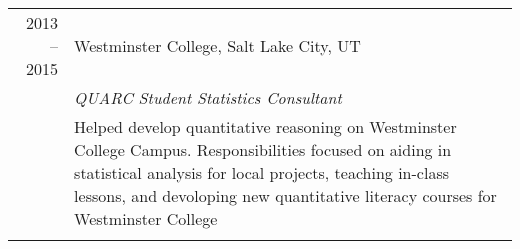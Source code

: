 \documentclass[a4paper,10pt]{report}
\begin{document}
\begin{tabular}{r|p{11cm}}
	\textsc{2013 -- 2015} & Westminster College, Salt Lake City, UT                                                                                                                                                    \\
	                      & \emph{QUARC Student Statistics Consultant}                                                                                                                                                 \\
	                      & \footnotesize{Helped develop quantitative reasoning on Westminster College Campus.
		Responsibilities focused on aiding in statistical analysis for
		local projects, teaching in-class lessons, and devoloping new
	quantitative literacy courses for Westminster College}                                                                                                                                                             \\
	\multicolumn{2}{c}{}                                                                                                                                                                                               \\
\end{tabular}

\end{document}
